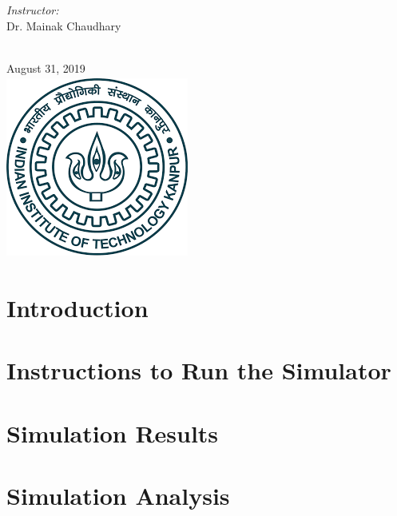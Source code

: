 \documentclass[12pt]{article}
\begin{document}
\begin{titlepage}
\begin{minipage}{0.4\textwidth}
\end{minipage}
\begin{minipage}{0.4\textwidth}
\begin{flushright} \large
\emph{Instructor:} \\
Dr. Mainak Chaudhary %
\end{flushright}
\end{minipage}\\[1cm]
{\large August 31, 2019}\\[1cm] %
\includegraphics[width=6cm,height=6cm,keepaspectratio]{iitk.png}%
\vfill %

\end{titlepage}
\newpage

\section{Introduction}


\section{Instructions to Run the Simulator}


\newpage
\section{Simulation Results}


\vspace{0.5cm}
\section{Simulation Analysis}

\end{document}

